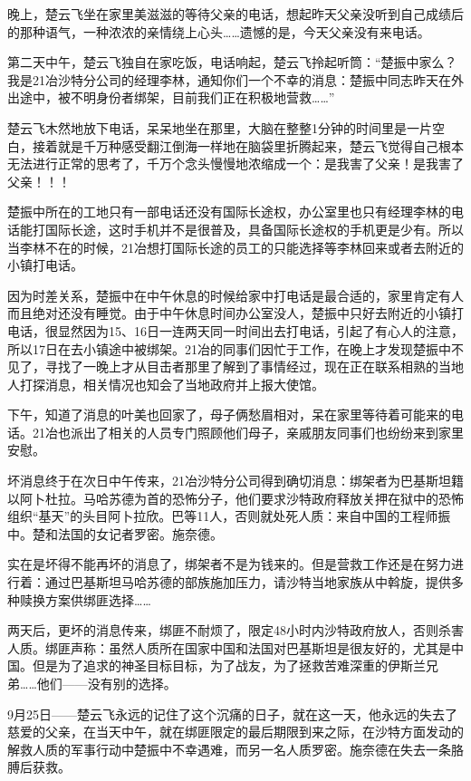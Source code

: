 晚上，楚云飞坐在家里美滋滋的等待父亲的电话，想起昨天父亲没听到自己成绩后的那种语气，一种浓浓的亲情绕上心头……遗憾的是，今天父亲没有来电话。

第二天中午，楚云飞独自在家吃饭，电话响起，楚云飞拎起听筒：“楚振中家么？我是21冶沙特分公司的经理李林，通知你们一个不幸的消息：楚振中同志昨天在外出途中，被不明身份者绑架，目前我们正在积极地营救……”

楚云飞木然地放下电话，呆呆地坐在那里，大脑在整整1分钟的时间里是一片空白，接着就是千万种感受翻江倒海一样地在脑袋里折腾起来，楚云飞觉得自己根本无法进行正常的思考了，千万个念头慢慢地浓缩成一个：是我害了父亲！是我害了父亲！！！

楚振中所在的工地只有一部电话还没有国际长途权，办公室里也只有经理李林的电话能打国际长途，这时手机并不是很普及，具备国际长途权的手机更是少有。所以当李林不在的时候，21冶想打国际长途的员工的只能选择等李林回来或者去附近的小镇打电话。

因为时差关系，楚振中在中午休息的时候给家中打电话是最合适的，家里肯定有人而且绝对还没有睡觉。由于中午休息时间办公室没人，楚振中只好去附近的小镇打电话，很显然因为15、16日一连两天同一时间出去打电话，引起了有心人的注意，所以17日在去小镇途中被绑架。21冶的同事们因忙于工作，在晚上才发现楚振中不见了，寻找了一晚上才从目击者那里了解到了事情经过，现在正在联系相熟的当地人打探消息，相关情况也知会了当地政府并上报大使馆。

下午，知道了消息的叶美也回家了，母子俩愁眉相对，呆在家里等待着可能来的电话。21冶也派出了相关的人员专门照顾他们母子，亲戚朋友同事们也纷纷来到家里安慰。

坏消息终于在次日中午传来，21冶沙特分公司得到确切消息：绑架者为巴基斯坦籍以阿卜杜拉。马哈苏德为首的恐怖分子，他们要求沙特政府释放关押在狱中的恐怖组织“基天”的头目阿卜拉欣。巴等11人，否则就处死人质：来自中国的工程师振中。楚和法国的女记者罗密。施奈德。

实在是坏得不能再坏的消息了，绑架者不是为钱来的。但是营救工作还是在努力进行着：通过巴基斯坦马哈苏德的部族施加压力，请沙特当地家族从中斡旋，提供多种赎换方案供绑匪选择……

两天后，更坏的消息传来，绑匪不耐烦了，限定48小时内沙特政府放人，否则杀害人质。绑匪声称：虽然人质所在国家中国和法国对巴基斯坦是很友好的，尤其是中国。但是为了追求的神圣目标目标，为了战友，为了拯救苦难深重的伊斯兰兄弟……他们——没有别的选择。

9月25日——楚云飞永远的记住了这个沉痛的日子，就在这一天，他永远的失去了慈爱的父亲，在当天中午，就在绑匪限定的最后期限到来之际，在沙特方面发动的解救人质的军事行动中楚振中不幸遇难，而另一名人质罗密。施奈德在失去一条胳膊后获救。

